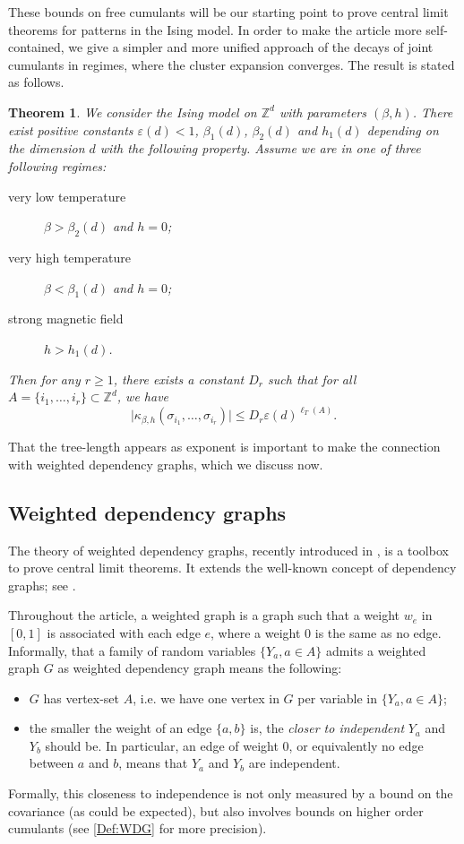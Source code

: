 \documentclass{amsart}
\newcommand{\field}[1]{\mathbb{#1}}
\newcommand{\Z}{\field{Z}}
\def\WDep{G}
\def\eps{\varepsilon}
\numberwithin{equation}{section}
\newtheorem{theorem}{Theorem}[section]
\theoremstyle{remark}
\begin{document}
These bounds on free cumulants will be our starting point to prove central limit theorems for patterns
in the Ising model.
In order to make the article more self-contained,
we give a simpler and more unified approach 
of the decays of joint cumulants in regimes, where the cluster expansion converges. 
The result is stated as follows.

\begin{theorem}
  We consider the Ising model on $\Z^d$ with parameters $(\beta,h)$.
  There exist positive constants $\eps(d)<1$, $\beta_1(d)$, $\beta_2(d)$ and $h_1(d)$ depending on the dimension $d$
  with the following property.
  Assume we are in one of three following regimes:
  \begin{description}
    \item[very low temperature] $\beta> \beta_2(d)$ and $h=0$;
    \item[very high temperature] $\beta < \beta_1(d)$ and $h=0$;
    \item[strong magnetic field] $h > h_1(d)$.
  \end{description}
  Then for any $r \ge 1$, there exists a constant $D_r$ such that for all $A=\{i_1, \dots, i_r\} \subset \Z^d$, we have
  \[\big| \kappa_{\beta,h}(\sigma_{i_1},\dots, \sigma_{i_r}) \big| 
  \le D_r \eps(d)^{\ell_T(A)}.\]
  \label{thm:bound_joint_cumulants}
\end{theorem}

That the tree-length appears as exponent
is important to make the connection with weighted dependency graphs, which we discuss now.


\subsection{Weighted dependency graphs}
\label{ssec:introWDG}
The theory of weighted dependency graphs, recently introduced in \cite{Valentin}, is a toolbox to prove central limit theorems.
It extends the well-known concept of dependency graphs; see \cite{Baldi_Rinott:DepGraphs_Stein,JansonDependencyGraphs}.

Throughout the article, a weighted graph is a graph such that a weight $w_e$ in $[0,1]$ is associated with each edge $e$,
where a weight $0$ is the same as no edge.
Informally, that a family of random variables $\{Y_a, a \in A\}$ admits a weighted graph $\WDep$ as weighted dependency graph means the following:
\begin{itemize}
  \item $G$ has vertex-set $A$, i.e. we have one vertex in $G$ per variable in $\{Y_a, a \in A\}$;
  \item the smaller the weight of an edge $\{a,b\}$ is,
    the {\em closer to independent} $Y_a$ and $Y_b$ should be.
    In particular, an edge of weight $0$, or equivalently no edge between $a$ and $b$,
    means that $Y_a$ and $Y_b$ are independent.
\end{itemize}
Formally, this closeness to independence is not only measured by a bound on the covariance (as could be expected),
but also involves bounds on higher order cumulants (see \cref{Def:WDG} for more precision).
\end{document}
